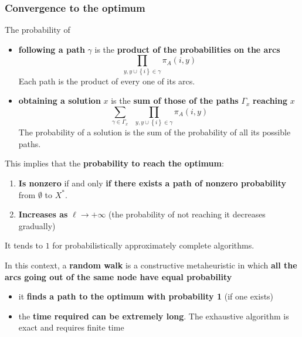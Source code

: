 \newpage

\subsubsection{Convergence to the optimum}
The probability of
\begin{itemize}
	\item \textbf{following a path} $\gamma$ is the \textbf{product of the probabilities on the arcs}
	$$ \prod_{y, y \cup \left\{i\right\} \in \gamma} \pi_A (i, y) $$
	Each path is the product of every one of its arcs.\\
	
	\item \textbf{obtaining a solution} $x$ is the \textbf{sum of those of the paths} $\Gamma_x$ \textbf{reaching} $x$
	$$ \sum_{\gamma \in \Gamma_x} \;\; \prod_{y, y \cup \left\{i\right\} \in \gamma} \pi_A (i,y) $$
	The probability of a solution is the sum of the probability of all its possible paths.\\
\end{itemize}

This implies that the \textbf{probability to reach the optimum}:
\begin{enumerate}
	\item \textbf{Is nonzero} if and only \textbf{if there exists a path of nonzero probability} from $\emptyset$ to $X^\ast$.\\
	
	\item \textbf{Increases as} $\ell \rightarrow + \infty$ (the probability of not reaching it decreases gradually)
\end{enumerate}

It tends to $1$ for probabilistically approximately complete algorithms.\\

\newpage

In this context, a \textbf{random walk} is a constructive metaheuristic in which \textbf{all the arcs going out of the same node have equal probability}
\begin{itemize}
	\item it \textbf{finds a path to the optimum with probability 1} (if one exists)
	
	\item the \textbf{time required can be extremely long}. The exhaustive algorithm is exact and requires finite time
\end{itemize}

\nn


